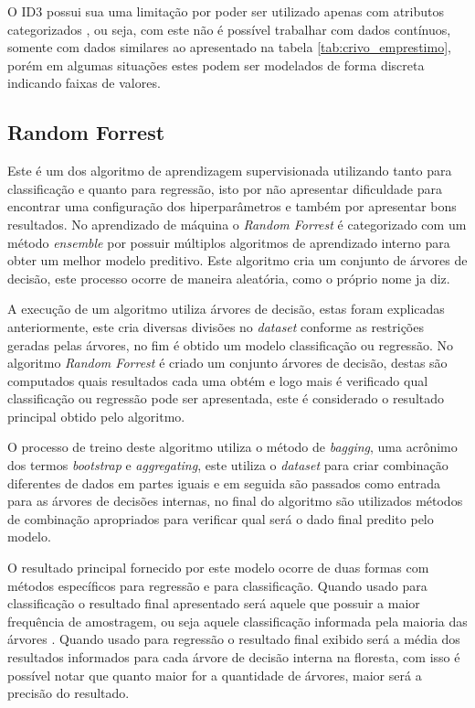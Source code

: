 \documentclass[
12pt,				%
oneside,			%
a4paper,			%
english,			%
french,				%
spanish,			%
brazil				%
]{abntex2}
\begin{document}
O ID3 possui sua uma limitação por poder ser utilizado apenas com atributos categorizados \cite{quinlan1986induction}, ou seja, com este não é possível trabalhar com dados contínuos, somente com dados similares ao apresentado na tabela \ref{tab:crivo_emprestimo}, porém em algumas situações estes podem ser modelados de forma discreta indicando faixas de valores.   


\subsection{Random Forrest}

Este é um dos algoritmo de aprendizagem supervisionada utilizando tanto para classificação e quanto para regressão, isto por não apresentar dificuldade para encontrar uma configuração dos hiperparâmetros e também por apresentar bons resultados. No aprendizado de máquina o \textit{Random Forrest} é categorizado com um método \textit{ensemble} por possuir múltiplos algoritmos de aprendizado interno para obter um melhor modelo preditivo. Este algoritmo cria um conjunto de árvores de decisão, este processo ocorre de maneira aleatória, como o próprio nome ja diz.
 
A execução de um algoritmo utiliza árvores de decisão, estas foram explicadas anteriormente, este cria diversas divisões no \textit{dataset} conforme as restrições geradas pelas árvores, no fim é obtido um modelo classificação ou regressão. No algoritmo \textit{Random Forrest} é criado um conjunto árvores de decisão, destas são computados quais resultados cada uma obtém e logo mais é verificado qual classificação ou regressão pode ser apresentada, este é considerado o resultado principal obtido pelo algoritmo.

O processo de treino deste algoritmo utiliza o método de \textit{bagging}, uma acrônimo dos termos \textit{bootstrap} e \textit{aggregating}, este 
 utiliza o \textit{dataset} para criar combinação diferentes de dados em partes iguais e em seguida são passados como entrada para as árvores de decisões internas, no final do algoritmo são utilizados métodos de combinação apropriados para verificar qual será o dado final predito pelo modelo.   

O resultado principal fornecido por este modelo ocorre de duas formas com métodos específicos para regressão e para classificação. Quando usado para classificação o resultado final apresentado será aquele que possuir a maior frequência de amostragem, ou seja aquele classificação informada pela maioria das árvores \cite{breiman2001random}. Quando usado para regressão o resultado final exibido será a média dos resultados informados para cada árvore de decisão interna na floresta, com isso é possível notar que quanto maior for a quantidade de árvores, maior será a precisão do resultado.
\end{document}

